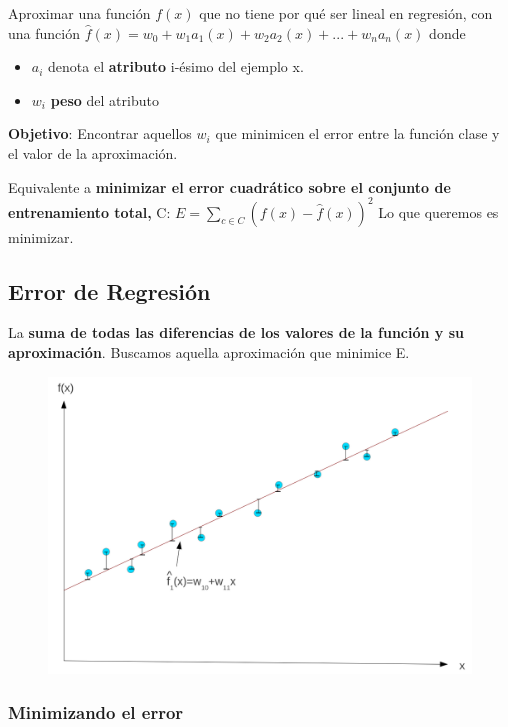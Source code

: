 \documentclass[12pt]{report} %
\begin{document}
Aproximar una función \(f(x)\) que no tiene por qué ser lineal en
regresión, con una función
\textbf{\(\hat{f}(x)= w_0 + w_1a_1(x)+ w_2a_2(x)+ ...+ w_na_n(x)\)}
donde

\begin{itemize}

\item
  \(a_i\) denota el \textbf{atributo} i-ésimo del ejemplo x.
\item
  \(w_i\) \textbf{peso} del atributo
\end{itemize}

\textbf{Objetivo}: Encontrar aquellos \(w_i\) que minimicen el error
entre la función clase y el valor de la aproximación.

Equivalente a \textbf{minimizar el error cuadrático sobre el conjunto de
entrenamiento total,} C: \(E= \sum _{c \in C} (f(x)-\hat{f}(x))^2\) Lo
que queremos es minimizar.

\subsection{Error de Regresión}

La \textbf{suma de todas las diferencias de los valores de la función y
su aproximación}. Buscamos aquella aproximación que minimice E.
\begin{figure}[H]
	{\includegraphics[scale=.10]{image-20210305212854142.png}}
\end{figure}

\subsubsection{Minimizando el error}
\end{document}
